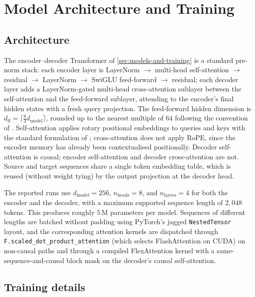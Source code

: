 \documentclass[12pt]{article}
\begin{document}
\section{Model Architecture and Training}
\label{app:model}

\subsection{Architecture}

The encoder--decoder Transformer of \cref{sec:models-and-training} is a standard pre-norm stack: each encoder layer is LayerNorm $\to$ multi-head self-attention $\to$ residual $\to$ LayerNorm $\to$ SwiGLU feed-forward $\to$ residual; each decoder layer adds a LayerNorm-gated multi-head cross-attention sublayer between the self-attention and the feed-forward sublayer, attending to the encoder's final hidden states with a fresh query projection. The feed-forward hidden dimension is $d_{\mathrm{ff}} = \lceil \tfrac{8}{3} d_{\mathrm{model}}\rceil$, rounded up to the nearest multiple of $64$ following the convention of \citet{shazeer2020glu}. Self-attention applies rotary positional embeddings to queries and keys with the standard formulation of \citet{su2024roformer}; cross-attention does not apply RoPE, since the encoder memory has already been contextualised positionally. Decoder self-attention is causal; encoder self-attention and decoder cross-attention are not. Source and target sequences share a single token embedding table, which is reused (without weight tying) by the output projection at the decoder head.

The reported runs use $d_{\mathrm{model}} = 256$, $n_{\mathrm{heads}} = 8$, and $n_{\mathrm{layers}} = 4$ for both the encoder and the decoder, with a maximum supported sequence length of $2{,}048$ tokens. This produces roughly $5$\,M parameters per model. Sequences of different lengths are batched without padding using PyTorch's jagged \texttt{NestedTensor} layout, and the corresponding attention kernels are dispatched through \texttt{F.scaled\_dot\_product\_attention} (which selects FlashAttention \citep{dao2022flashattention} on CUDA) on non-causal paths and through a compiled FlexAttention kernel with a same-sequence-and-causal block mask on the decoder's causal self-attention.

\subsection{Training details}
\label{app:training-details}
\end{document}
